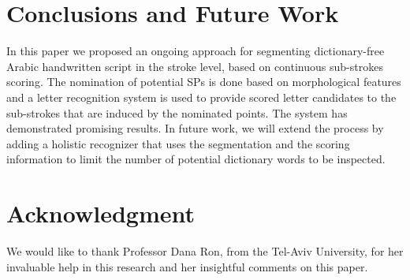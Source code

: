 \documentclass[10pt, conference, compsocconf]{IEEEtran}
\begin{document}
\section{Conclusions and Future Work}
In this paper we proposed an ongoing approach for segmenting dictionary-free Arabic handwritten script in the stroke level, based on continuous sub-strokes scoring. The nomination of potential SPs is done based on morphological features and a letter recognition system is used to provide scored letter candidates to the sub-strokes that are induced by the nominated points. The  system has demonstrated promising results.
In future work, we will extend the process by adding a holistic recognizer that uses the segmentation and the scoring information to limit the number of potential dictionary words to be inspected.\\

\section{Acknowledgment}
We would like to thank Professor Dana Ron, from the Tel-Aviv University, for her invaluable help in this research and her insightful comments on this paper. \\



\end{document}
